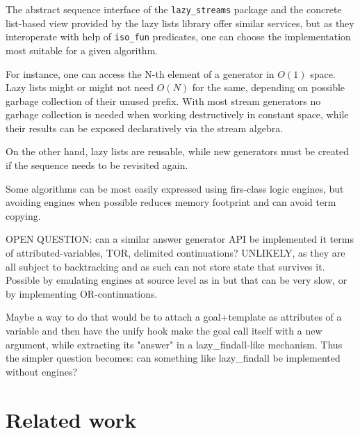 \documentclass{new_tlp}
\begin{document}
The abstract sequence interface of the {\tt lazy\_streams} package and
the concrete list-based view provided by the lazy lists library offer
similar services, but as they interoperate with help of {\tt iso\_fun} predicates,
one can choose the  implementation most suitable for a given algorithm.

For instance, one  can access the N-th element of a  generator in $O(1)$ space.
Lazy lists might or might not need $O(N)$ for the same, depending on possible garbage collection of their unused prefix.
With most stream generators no garbage collection is needed when working destructively in constant space, while their results can be exposed declaratively via the stream algebra.

On the other hand, lazy lists are reusable, while new generators 
must be created if the sequence needs to be revisited again.

Some algorithms can be most easily expressed using firs-class logic engines, but
avoiding engines when possible reduces memory footprint and can avoid term copying.

{\Large OPEN QUESTION: can a similar answer generator API be implemented
it terms of  attributed-variables, TOR, delimited continuations? 
UNLIKELY, as they are all subject to backtracking and as such can not
store state that survives it. Possible by emulating engines at source level as in
\cite{padl09inter}
but
that can be very slow, or by implementing OR-continuations.
}

Maybe a way to do that would be to attach a goal+template as attributes of a variable
and then have the unify hook make the goal call itself with a new argument, while
extracting its "answer" in a lazy\_findall-like mechanism. Thus the simpler question becomes:
{\large can something like lazy\_findall be implemented without engines?}





\section{Related work}


\begin{comment}
Maybe?
\BI 
\I some history - see
\cite{tarau:parimp99,tarau:cl2000,iclp08:inter,ciclops08:pINTER}
\cite{coord11tarau}
\cite{bp2011}
\I work on delimited continuations \cite{delim}, hookable disjunction \cite{tor}
\I work on pipelines \cite{pipelines}
\EI
\end{comment}
\end{document}
